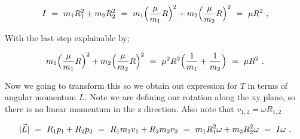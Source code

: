 \documentclass{article}
\begin{document}
\begin{equation} \label{eb-eq-256-40}
I \hspace{0.125cm} = \hspace{0.125cm} m_1 R^{2}_{1} + m_2 R^{2}_{2} \hspace{0.125cm} = \hspace{0.125cm} m_1 \Big( \frac{\mu}{m_1} R \Big)^2 + m_2 \Big( \frac{\mu}{m_2} R \Big)^2 \hspace{0.125cm} = \hspace{0.125cm} \mu R^2 \hspace{0.125cm} ,
\end{equation}

With the last step explainable by;

\begin{equation} \label{eb-eq-256-41}
m_1 \Big( \frac{\mu}{m_1} R \Big)^2 + m_2 \Big( \frac{\mu}{m_2} R \Big)^2 \hspace{0.125cm} = \hspace{0.125cm} \mu^2 R^2 \Big( \frac{1}{m_1} + \frac{1}{m_2} \Big) \hspace{0.125cm} = \hspace{0.125cm} \mu R^2 \hspace{0.125cm} .
\end{equation}

Now we going to transform this so we obtain out expression for \begin{math} T \end{math} in terms of angular momentum \begin{math} L \end{math}. Note we are defining our rotation along the xy plane, so there is no linear momentum in the z direction. Also note that \begin{math} v_{1,2} = \omega R_{1,2} \end{math}

\begin{equation} \label{eb-eq-256-42}
|\vec{L}| \hspace{0.125cm} = \hspace{0.125cm} R_1 p_1 + R_2 p_2 \hspace{0.125cm} = \hspace{0.125cm} R_1 m_1 v_1 + R_2 m_2 v_2 \hspace{0.125cm} = \hspace{0.125cm} m_1 R^{2}_{1} \omega + m_2 R^{2}_{2} \omega \hspace{0.125cm} = \hspace{0.125cm} I \omega \hspace{0.125cm} .
\end{equation}
\end{document}
